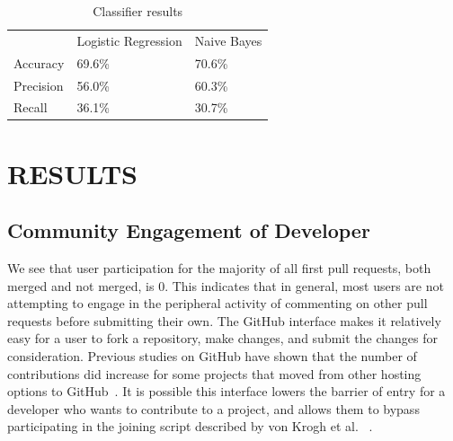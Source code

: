 \documentclass{sigchi}
\begin{document}
\begin{table}[ht] \centering
  \caption{Classifier results}
  \label{tbl:classifiers}
  \begin{tabular}{lll}
  \hline\hline
  ~         & Logistic Regression & Naive Bayes \\
  Accuracy  & 69.6\%              & 70.6\%      \\
  Precision & 56.0\%              & 60.3\%      \\
  Recall    & 36.1\%              & 30.7\%      \\
  \hline
  \end{tabular}
\end{table}

\section{RESULTS} \label{chap:results}

\subsection{Community Engagement of Developer} \label{results_engagement}

We see that user participation for the majority of all first pull requests, both
merged and not merged, is 0. This indicates that in general, most users are not
attempting to engage in the peripheral activity of commenting on other pull
requests before submitting their own. The GitHub interface makes it relatively
easy for a user to fork a repository, make changes, and submit the changes for
consideration. Previous studies on GitHub have shown that the number of
contributions did increase for some projects that moved from other hosting
options to GitHub~\cite{mcdonald_performance_2013}. It is possible this
interface lowers the barrier of entry for a developer who wants to contribute to
a project, and allows them to bypass participating in the joining script
described by von Krogh et al. ~\cite{von_krogh_community_2003}.
\end{document}

